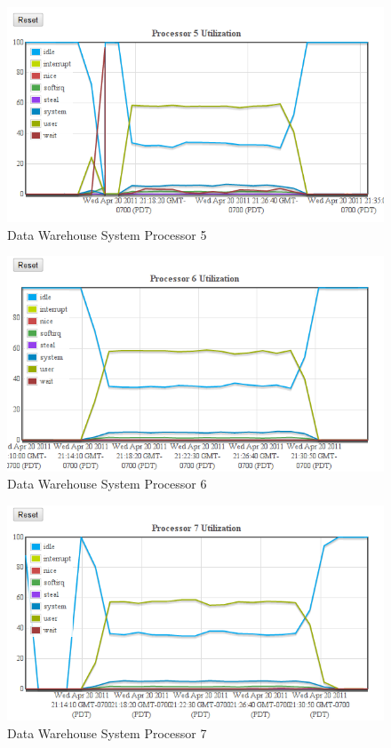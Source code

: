 \documentclass[twocolumn,letterpaper]{article}
\begin{document}
\begin{figure}[ht]
  \begin{center}
    \includegraphics[scale=0.37]{etl-c6-cpu-05}
  \end{center}
  \caption{Data Warehouse System Processor 5}
\end{figure}

\begin{figure}[ht]
  \begin{center}
    \includegraphics[scale=0.37]{etl-c6-cpu-06}
  \end{center}
  \caption{Data Warehouse System Processor 6}
\end{figure}

\begin{figure}[ht]
  \begin{center}
    \includegraphics[scale=0.37]{etl-c6-cpu-07}
  \end{center}
  \caption{Data Warehouse System Processor 7}
  \label{etl-c6-cpu07}
\end{figure}
\end{document}
